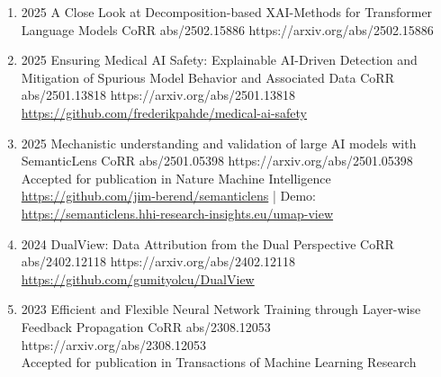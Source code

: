 {\begin{enumerate}
                        
        \item {}
                        {2025}
                        {A Close Look at Decomposition-based XAI-Methods for Transformer Language Models}
                        {CoRR abs/2502.15886}
                        {https://arxiv.org/abs/2502.15886}

       
        \item {}
                        {2025}
                        {Ensuring Medical AI Safety: Explainable AI-Driven Detection and Mitigation of Spurious Model Behavior and Associated Data}
                        {CoRR abs/2501.13818}
                        {https://arxiv.org/abs/2501.13818}
                        {
                            \\\href{https://github.com/frederikpahde/medical-ai-safety}{https://github.com/frederikpahde/medical-ai-safety}
                        }

        \item {}
                        {2025}
                        {Mechanistic understanding and validation of large AI models with SemanticLens}
                        {CoRR abs/2501.05398}
                        {https://arxiv.org/abs/2501.05398}
                        {   
                            \\ Accepted for publication in Nature Machine Intelligence
                            \\\href{https://github.com/jim-berend/semanticlens}{https://github.com/jim-berend/semanticlens} | Demo: \href{https://semanticlens.hhi-research-insights.eu/umap-view}{https://semanticlens.hhi-research-insights.eu/umap-view}
                        }

        \item {}
                        {2024}
                        {DualView: Data Attribution from the Dual Perspective}
                        {CoRR abs/2402.12118}
                        {https://arxiv.org/abs/2402.12118}
                        {\\\href{https://github.com/gumityolcu/DualView}{https://github.com/gumityolcu/DualView}}

        \item {}
                        {2023}
                        {Efficient and Flexible Neural Network Training through Layer-wise Feedback Propagation}
                        {CoRR abs/2308.12053}
                        {https://arxiv.org/abs/2308.12053}
                        {
                        \\ Accepted for publication in Transactions of Machine Learning Research
                        }


\end{enumerate}}
